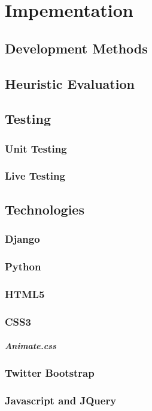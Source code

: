 \documentclass{mproj}
\begin{document}
\chapter{Impementation}\label{implementation}
\section{Development Methods}
\section{Heuristic Evaluation}
\section{Testing}
\subsection{Unit Testing}
\subsection{Live Testing}
\section{Technologies}
\subsection{Django}
\label{subsec:Django}
\subsection{Python}
\subsection{HTML5}
\subsection{CSS3}
\paragraph{Animate.css}
\subsection{Twitter Bootstrap}
\subsection{Javascript and JQuery}
\end{document}
